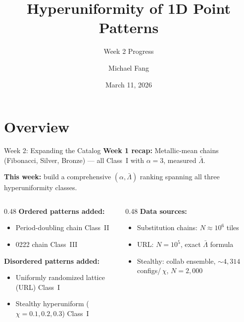 \documentclass[aspectratio=169, 11pt]{beamer}
\title[Hyperuniformity of 1D Point Patterns]{%
  Hyperuniformity of 1D Point Patterns}
\subtitle{Week 2 Progress}
\author{Michael Fang}
\institute{Princeton University}
\date{March 11, 2026}
\begin{document}
\begin{frame}
  \titlepage
\end{frame}

\section{Overview}

\begin{frame}{Week 2: Expanding the Catalog}
  \textbf{Week 1 recap:} Metallic-mean chains (Fibonacci, Silver, Bronze)
  --- all Class~I with $\alpha=3$, measured $\bar{\Lambda}$.

  \bigskip
  \textbf{This week:} build a comprehensive $(\alpha, \bar{\Lambda})$
  ranking spanning all three hyperuniformity classes.

  \medskip
  \begin{columns}[T]
    \begin{column}{0.48\textwidth}
      \textbf{Ordered patterns added:}
      \begin{itemize}
        \item Period-doubling chain
          \hfill{\small\textcolor{classIIcol}{Class~II}}
        \item 0222 chain
          \hfill{\small\textcolor{classIIIcol}{Class~III}}
      \end{itemize}

      \medskip
      \textbf{Disordered patterns added:}
      \begin{itemize}
        \item Uniformly randomized lattice (URL)
          \hfill{\small\textcolor{classIcol}{Class~I}}
        \item Stealthy hyperuniform ($\chi = 0.1, 0.2, 0.3$)
          \hfill{\small\textcolor{classIcol}{Class~I}}
      \end{itemize}
    \end{column}
    \begin{column}{0.48\textwidth}
      \textbf{Data sources:}
      \begin{itemize}
        \item Substitution chains: $N \approx 10^6$ tiles
        \item URL: $N = 10^5$, exact $\bar{\Lambda}$ formula
        \item Stealthy: collab ensemble,
          ${\sim}4{,}314$ configs/\,$\chi$, $N=2{,}000$
      \end{itemize}
    \end{column}
  \end{columns}
\end{frame}
\end{document}
